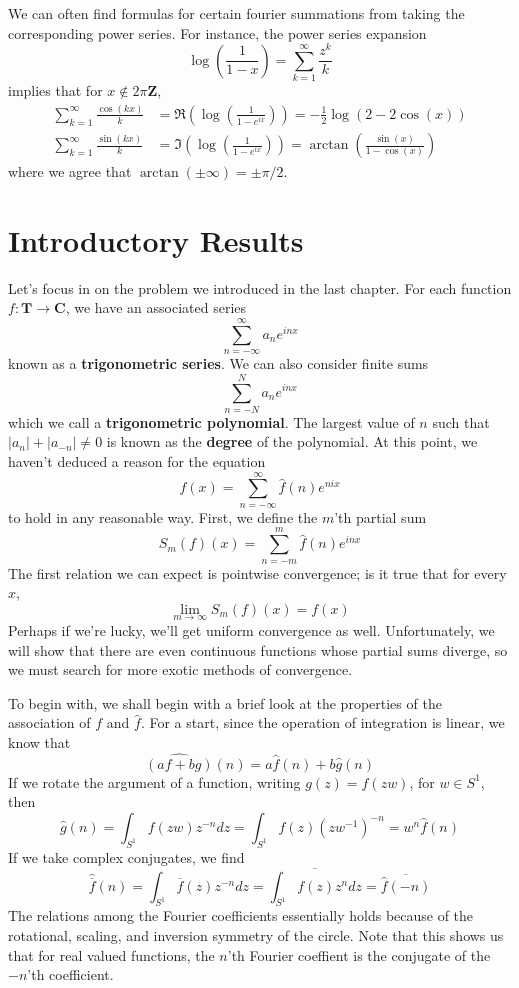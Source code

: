 \begin{example}
    We can often find formulas for certain fourier summations from taking the corresponding power series. For instance, the power series expansion
    \[ \log \left( \frac{1}{1-x} \right) = \sum_{k = 1}^\infty \frac{z^k}{k} \]
    implies that for $x \not \in 2 \pi \mathbf{Z}$,
    \begin{align*}
        \sum_{k = 1}^\infty \frac{\cos(kx)}{k} &= \Re \left( \log \left( \frac{1}{1 - e^{ix}} \right) \right) = -\frac{1}{2} \log(2 - 2\cos(x))\\
        \sum_{k = 1}^\infty \frac{\sin(kx)}{k} &= \Im \left( \log \left( \frac{1}{1 - e^{ix}} \right) \right) = \arctan \left( \frac{\sin(x)}{1 - \cos(x)} \right)
    \end{align*}
    where we agree that $\arctan(\pm \infty) = \pm \pi/2$.
\end{example}




\chapter{Introductory Results}

Let's focus in on the problem we introduced in the last chapter. For each function $f: \mathbf{T} \to \mathbf{C}$, we have an associated series
%
\[ \sum_{n = -\infty}^\infty a_n e^{inx} \]
%
known as a {\bf trigonometric series}. We can also consider finite sums
%
\[ \sum_{n = -N}^N a_n e^{inx} \]
%
which we call a {\bf trigonometric polynomial}. The largest value of $n$ such that $|a_n| + |a_{-n}| \neq 0$ is known as the {\bf degree} of the polynomial. At this point, we haven't deduced a reason for the equation
%
\[ f(x) = \sum_{n = -\infty}^\infty \hat{f}(n) e^{nix} \]
%
to hold in any reasonable way. First, we define the $m$'th partial sum
%
\[ S_m(f)(x) = \sum_{n = -m}^m \hat{f}(n) e^{inx} \]
%
The first relation we can expect is pointwise convergence; is it true that for every $x$,
%
\[ \lim_{m \to \infty} S_m(f)(x) = f(x) \]
%
Perhaps if we're lucky, we'll get uniform convergence as well. Unfortunately, we will show that there are even continuous functions whose partial sums diverge, so we must search for more exotic methods of convergence.

To begin with, we shall begin with a brief look at the properties of the association of $f$ and $\hat{f}$. For a start, since the operation of integration is linear, we know that
%
\[ \widehat{(af + bg)}(n) = a \hat{f}(n) + b \hat{g}(n) \]
%
If we rotate the argument of a function, writing $g(z) = f(zw)$, for $w \in S^1$, then
%
\[ \hat{g}(n) = \int_{S^1} f(zw) z^{-n} dz = \int_{S^1} f(z) (zw^{-1})^{-n} = w^n \hat{f}(n) \]
%
If we take complex conjugates, we find
%
\[ \hat{\overline{f}}(n) = \int_{S^1} \overline{f}(z) z^{-n} dz = \overline{\int_{S^1} f(z) z^n dz} = \overline{\hat{f}(-n)} \]
%
The relations among the Fourier coefficients essentially holds because of the rotational, scaling, and inversion symmetry of the circle. Note that this shows us that for real valued functions, the $n$'th Fourier coeffient is the conjugate of the $-n$'th coefficient.

